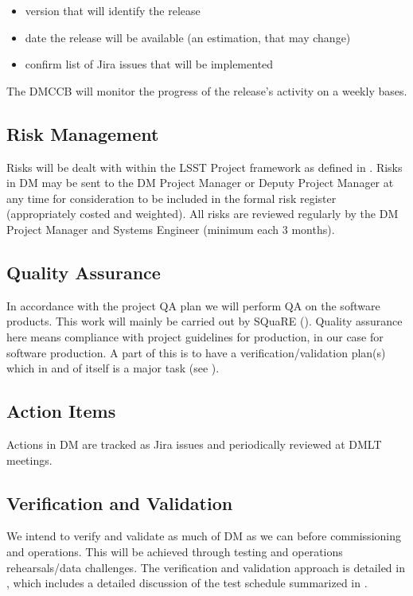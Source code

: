 \begin{itemize}
\item version that will identify the release
\item date the release will be available (an estimation, that may change)
\item confirm list of Jira issues that will be implemented
\end{itemize}

The DMCCB will monitor the progress of the release's activity on a weekly bases.

\subsection {Risk Management } \label{sect:risk}

Risks will be dealt with within the LSST Project framework as defined in .
Risks in DM may be sent to the DM Project Manager or Deputy Project Manager at any time for consideration to be included in the formal risk register (appropriately costed and weighted). All risks are reviewed regularly by the DM Project Manager and Systems Engineer (minimum each 3 months).


\subsection {Quality Assurance  } \label{sect:pa}

In accordance with the project QA plan  we will perform QA on the software products.
This work will mainly be carried out by SQuaRE ().
Quality assurance here means compliance with project guidelines for production, in our case for software production.
A part of this is to have a verification/validation plan(s) which in and of itself is a major task (see ).


\subsection{Action Items }
Actions in DM are tracked as Jira issues and periodically reviewed at DMLT meetings.


\subsection {Verification and Validation } \label{sect:vanv}

We intend to verify and validate as much of DM as we can before commissioning and operations.
This will be achieved through testing and operations rehearsals/data challenges.
The verification and validation approach is detailed in , which includes a detailed discussion of the test schedule summarized in .
